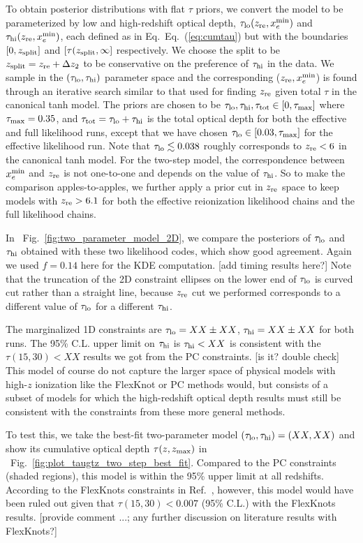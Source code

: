 \documentclass[prd,twocolumn,amsmath,amssymb,floatfix,superscriptaddress,nofootinbib]{revtex4-1}
\newcommand{\refeq}[1]{Eq.~(\ref{eq:#1})}
\newcommand{\reffig}[1]{Fig.~\ref{fig:#1}}
\newcommand{\zmax}{z_{\rm max}}
\newcommand{\zre}{z_{\rm re}}
\newcommand{\xemin}{x_e^{\rm min}}
\newcommand{\tauhi}{\tau_{\rm hi}}
\newcommand{\taulo}{\tau_{\rm lo}}
\begin{document}
To obtain posterior distributions with flat $\tau$ priors, we convert the model to be parameterized by low and high-redshift optical depth, $\taulo(\zre, \xemin)$ and $\tauhi(\zre, \xemin)$, 
each defined as in Eq.~\refeq{cumtau} but with the boundaries $[0, z_{\rm split}]$ and $[\tau(z_{\rm split}, \infty]$ respectively. We choose the split to be $z_{\rm split} = \zre + \Delta z_2$ to be conservative on the preference of $\tauhi$ in the data. 
We sample in the $(\taulo, \tauhi)$ parameter space and the corresponding ($\zre, \xemin$) is found through an iterative search similar to that used for finding $\zre$ given total $\tau$ in the canonical tanh model. 
The priors are chosen to be $\taulo, \tauhi, \tau_{\rm tot} \in [0, \tau_{\rm max}]$ where $\tau_{\rm max} = 0.35$, and $\tau_{\rm tot} = \taulo + \tauhi$ is the total optical depth for both the effective and full likelihood runs, 
except that we have chosen $\taulo \in [0.03, \tau_{\rm max}]$ for the effective likelihood run. 
Note that $\taulo \lesssim 0.038$ roughly corresponds to $\zre < 6$ in the canonical tanh model. For the two-step model, the correspondence between $\xemin$ and $\zre$ is not one-to-one and depends on the value of $\tauhi$. 
So to make the comparison apples-to-apples, we further apply a prior cut in $\zre$ space to keep models with $\zre > 6.1$ for both the effective reionization likelihood chains and the full likelihood chains.

In ~\reffig{two_parameter_model_2D}, we compare the posteriors of $\taulo$ and $\tauhi$ obtained with these two likelihood codes, which show good agreement. Again we used $f = 0.14$ here for the KDE computation. [add timing results here?] Note that the truncation of the 2D constraint ellipses on the lower end of $\taulo$ is curved cut rather than a straight line, because $\zre$ cut we performed corresponds to a different value of $\taulo$ for a different $\tauhi$. 

The marginalized 1D constraints are $\taulo = XX \pm XX$, $\tauhi = XX \pm XX$ for both runs. The 95\% C.L. upper limit on $\tauhi$ is $\tauhi < XX$ is consistent with the $\tau(15, 30) < XX$ results we got from the PC constraints. [is it? double check] This model of course do not capture the larger space of physical models with high-$z$ ionization like the FlexKnot or PC methods would, but consists of a subset of models for which the high-redshift optical depth results must still be consistent with the constraints from these more general methods. 

To test this, we take the best-fit two-parameter model $(\taulo, \tauhi) = (XX, XX)$ and show its cumulative optical depth $\tau(z, \zmax)$ in ~\reffig{plot_taugtz_two_step_best_fit}. Compared to the PC constraints (shaded regions), this model is within the 95\% upper limit at all redshifts. According to the FlexKnots constraints in Ref.~\cite{}, however, this model would have been ruled out given that $\tau(15, 30) < 0.007$ (95\% C.L.) with the FlexKnots results. [provide comment ...; any further discussion on literature results with FlexKnots?]
\end{document}
